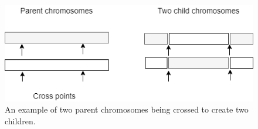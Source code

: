 \begin{figure}[h]
	\centering
	\includegraphics[width=0.7\linewidth]{theory/GeneticAlgoCrossover.png}
	\caption{An example of two parent chromosomes being crossed to create two children.}
	\label{fig:geneticalgocrossover}
\end{figure}

